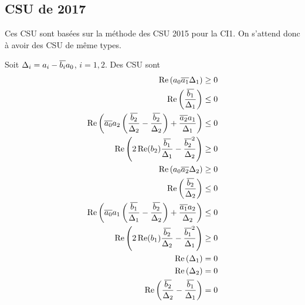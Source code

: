 

\subsection{CSU de 2017}

  Ces CSU sont basées sur la méthode des CSU 2015 pour la CI1. On s'attend donc à avoir des CSU de même types.

  \begin{prop}
    Soit \(\Delta_i = a_i-{\overline{b_i}}a_0\), \(i=1,2\). Des CSU sont
    \begin{align}
      \operatorname{Re}\left(a_0{\overline{a_1}}\Delta_1\right) \ge 0 \\
      \operatorname{Re}\left(\dfrac{{\overline{b_1}}}{\Delta_1}\right) \le 0 \\
      \operatorname{Re}\left({\overline{a_0}}a_2\left(\dfrac{{\overline{b_2}}}{\Delta_2}-\dfrac{{\overline{b_2}}}{\Delta_2}\right) + \dfrac{{\overline{a_2}}a_1}{\Delta_1} \right)\le 0\\
      \operatorname{Re}\left(2\operatorname{Re}(b_2)\dfrac{{\overline{b_1}}}{\Delta_1}-\dfrac{{\overline{b_2}}^2}{\Delta_2}\right) \ge 0\\
      \operatorname{Re}\left(a_0{\overline{a_2}}\Delta_2\right) \ge 0 \\
      \operatorname{Re}\left(\dfrac{{\overline{b_2}}}{\Delta_2}\right) \le 0 \\
      \operatorname{Re}\left({\overline{a_0}}a_1\left(\dfrac{{\overline{b_1}}}{\Delta_1}-\dfrac{{\overline{b_2}}}{\Delta_2}\right) + \dfrac{{\overline{a_1}}a_2}{\Delta_2} \right)\le 0\\
      \operatorname{Re}\left(2\operatorname{Re}(b_1)\dfrac{{\overline{b_2}}}{\Delta_2}-\dfrac{{\overline{b_1}}^2}{\Delta_1}\right) \ge 0\\
      \operatorname{Re}\left(\Delta_1\right) = 0 \\
      \operatorname{Re}\left(\Delta_2\right) = 0 \\
      \operatorname{Re}\left(\dfrac{{\overline{b_2}}}{\Delta_2}-\dfrac{{\overline{b_1}}}{\Delta_1}\right) = 0
    \end{align}
  \end{prop}
  
